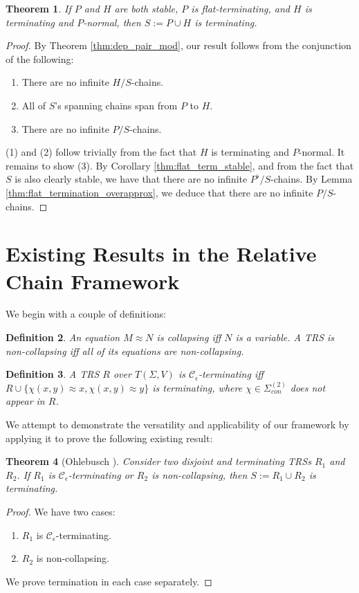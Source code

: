\documentclass{article}
\newtheorem{theorem}{Theorem}[section]
\newtheorem{definition}[theorem]{Definition}
\renewcommand\em{\bfseries}
\begin{document}
\begin{theorem}
    If $P$ and $H$ are both stable, $P$ is flat-terminating, and $H$ is terminating and $P$-normal, then $S := P \cup H$ is terminating.
\end{theorem}

\begin{proof}
    By Theorem \ref{thm:dep_pair_mod}, our result follows from the conjunction of the following: \begin{enumerate}
        \item There are no infinite $H/S$-chains.
        \item All of $S$'s spanning chains span from $P$ to $H$.
        \item There are no infinite $P/S$-chains.
    \end{enumerate}
    (1) and (2) follow trivially from the fact that $H$ is terminating and $P$-normal. It remains to show (3). By Corollary \ref{thm:flat_term_stable}, and from the fact that $S$ is also clearly stable, we have that there are no infinite $P^\flat/S$-chains. By Lemma \ref{thm:flat_termination_overapprox}, we deduce that there are no infinite $P/S$-chains. 
\end{proof}



\section{Existing Results in the Relative Chain Framework}

We begin with a couple of definitions:
\begin{definition}
    An equation $M \approx N$ is \emph{collapsing} iff $N$ is a variable. A TRS is \emph{non-collapsing} iff all of its equations are non-collapsing. 
\end{definition}
\begin{definition}
    A TRS $R$ over $T(\Sigma, V)$ is \emph{$\mathcal{C}_\epsilon$-terminating} iff $R \cup \{\chi(x, y) \approx x, \chi (x, y)\approx y\}$ is terminating, where $\chi \in \Sigma^{(2)}_{con}$ does not appear in $R$.   
\end{definition}

We attempt to demonstrate the versatility and applicability of our framework by applying it to prove the following existing result:
\begin{theorem}[Ohlebusch \cite{ohlebusch1994modular}]
    Consider two disjoint and terminating TRSs $R_1$ and $R_2$. If $R_1$ is $\mathcal{C}_\epsilon$-terminating or $R_2$ is non-collapsing, then $S := R_1 \cup R_2$ is terminating.
\end{theorem}

\begin{proof}
    We have two cases: \begin{enumerate}
        \item $R_1$ is $\mathcal{C}_\epsilon$-terminating.
        \item $R_2$ is non-collapsing.
    \end{enumerate}
    We prove termination in each case separately.


\end{proof}


\renewcommand\em{\it}
\printbibliography[title={References}]
\end{document}
